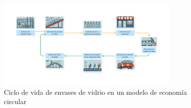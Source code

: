 \begin{figure}[!htpb]
    \centering
    \includegraphics[width=0.8\textwidth]{Figures/glass-lifecycle.png}
    \caption{Ciclo de vida de envases de vidrio en un modelo de economía circular}
    \label{fig:glass-lifecycle}
\end{figure}


